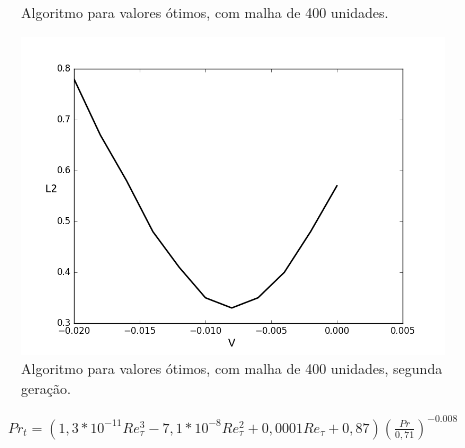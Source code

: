\documentclass[xcolor=dvipsnames,10pt,aspectratio=169]{beamer}
\begin{document}
\begin{frame}
\begin{minipage}[h!]{0.24\textwidth}
\begin{figure}
			\caption{Algoritmo para valores ótimos, com malha de 400 unidades.}
		\end{figure}
	\end{minipage}\hfill
\begin{minipage}[h!]{0.24\textwidth}
	\begin{figure}
		\centering
		\includegraphics[angle=0, scale=0.20]{A400zoon}
		\caption{Algoritmo para valores ótimos, com malha de 400 unidades, segunda geração.}
	\end{figure}
\end{minipage}	
	\begin{equation}
\begin{split}
Pr_t = \left( 1,3 * 10^{-11} Re_\tau^3 - 7,1 * 10^{-8} Re_\tau^2 + 0,0001 Re_\tau + 0,87 \right) \left(  \frac{Pr}{0,71}\right) ^{-0.008}
\end{split}
\end{equation}	
\end{frame}	
	
	
	
	
	
	
%	
%	
	
	
	
\end{document}
